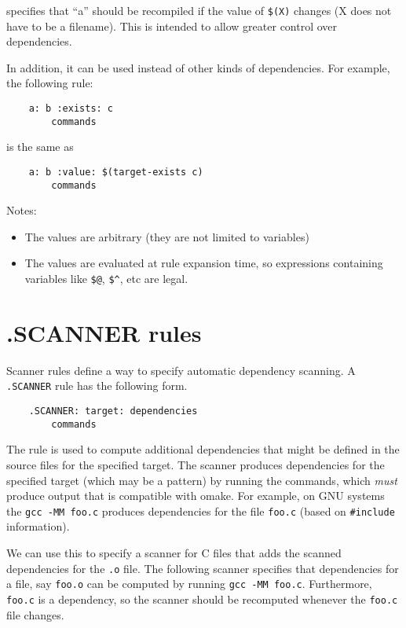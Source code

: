 specifies that ``a'' should be recompiled if the value of \verb+$(X)+ changes
(X does not have to be a filename).  This is intended to allow greater
control over dependencies.

In addition, it can be used instead of other kinds of dependencies. For example,
the following rule:

\begin{verbatim}
    a: b :exists: c
        commands
\end{verbatim}

is the same as

\begin{verbatim}
    a: b :value: $(target-exists c)
        commands
\end{verbatim}

Notes:
\begin{itemize}
\item The values are arbitrary (they are not limited to variables)
\item The values are evaluated at rule expansion time, so expressions
containing variables like \verb+$@+, \verb+$^+, etc are legal.
\end{itemize}

\section{.SCANNER rules}

Scanner rules define a way to specify automatic dependency scanning.  A \verb+.SCANNER+ rule has the
following form.

\begin{verbatim}
    .SCANNER: target: dependencies
        commands
\end{verbatim}

The rule is used to compute additional dependencies that might be defined in the source files for
the specified target.  The scanner produces dependencies for the specified target (which may be a
pattern) by running the commands, which \emph{must} produce output that is compatible with omake.
For example, on GNU systems the \verb+gcc -MM foo.c+ produces dependencies for the file \verb+foo.c+
(based on \verb+#include+ information).

We can use this to specify a scanner for C files that adds the scanned dependencies for the
\verb+.o+ file.  The following scanner specifies that dependencies for a file, say \verb+foo.o+ can
be computed by running \verb+gcc -MM foo.c+.  Furthermore, \verb+foo.c+ is a dependency, so the
scanner should be recomputed whenever the \verb+foo.c+ file changes.

